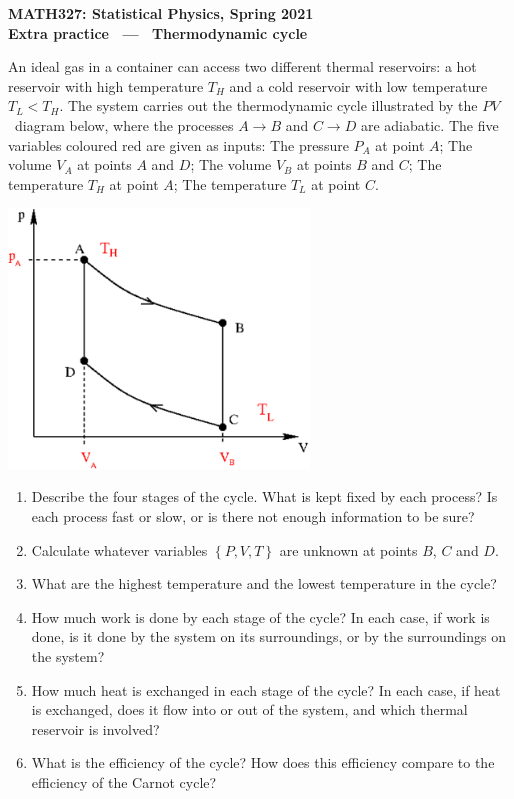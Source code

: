 \documentclass[12 pt]{article} %
\begin{document}
\newcommand{\thisweek}{MATH327 Extra (Cycle)}
\newcommand{\moddate}{Last modified 21 Mar.~2021}
\begin{center}
  {\Large \textbf{MATH327: Statistical Physics, Spring 2021}} \\[12 pt]
  {\Large \textbf{Extra practice \ --- \ Thermodynamic cycle}} \\[24 pt]
\end{center}

An ideal gas in a container can access two different thermal reservoirs: a hot reservoir with high temperature $T_H$ and a cold reservoir with low temperature $T_L < T_H$.
The system carries out the thermodynamic cycle illustrated by the $PV$~diagram below, where the processes $A \to B$ and $C \to D$ are adiabatic.
The five variables coloured red are given as inputs: The pressure $P_A$ at point $A$; The volume $V_A$ at points $A$ and $D$; The volume $V_B$ at points $B$ and $C$; The temperature $T_H$ at point $A$; The temperature $T_L$ at point $C$.

\begin{center}\includegraphics[width=0.6\textwidth]{figs/cycle.pdf}\end{center}

\begin{enumerate}[label={(\alph*)}]
  \item Describe the four stages of the cycle.
        What is kept fixed by each process?
        Is each process fast or slow, or is there not enough information to be sure?
  \item Calculate whatever variables $\left\{P, V, T\right\}$ are unknown at points $B$, $C$ and $D$.
  \item What are the highest temperature and the lowest temperature in the cycle?
  \item How much work is done by each stage of the cycle?
        In each case, if work is done, is it done by the system on its surroundings, or by the surroundings on the system?
  \item How much heat is exchanged in each stage of the cycle?
        In each case, if heat is exchanged, does it flow into or out of the system, and which thermal reservoir is involved?
  \item What is the efficiency of the cycle?
        How does this efficiency compare to the efficiency of the Carnot cycle?
\end{enumerate}
\end{document}

